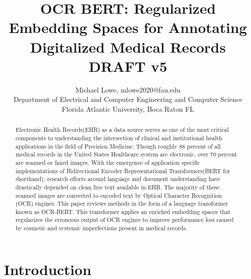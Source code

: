 \documentclass{article}
\author{Michael Lowe, mlowe2020@fau.edu \\
Department of Electrical and Computer Engineering and Computer Science \\ 
Florida Atlantic University, Boca Raton FL}
\title{OCR BERT: Regularized Embedding Spaces for Annotating Digitalized Medical Records DRAFT v5}
\begin{document}
   
\maketitle

\begin{abstract}
Electronic Health Records(EHR) as a data source serves as one of the most critical components to understanding the intersection of clinical and institutional health applications in the field of Precision Medicine. Though roughly 88 percent of all medical records in the United States Healthcare system are electronic, over 70 percent are scanned or faxed images. With the emergence  of application specific implementations of Bidirectional Encoder Representational Transformers(BERT for shorthand), research efforts around language and document understanding have drastically depended on clean free text available in EHR. The majority of these scanned images are converted to encoded text by Optical Character Recognition (OCR) engines. This paper reviews methods in the form of a language transformer known as OCR-BERT. This transformer applies an  enriched embedding spaces that regularizes the erroneous output of OCR engines to improve performance loss caused by cosmetic and systemic imperfections present in medical records.
\end{abstract}

\section{Introduction}\label{sec:intro}
\end{document}
